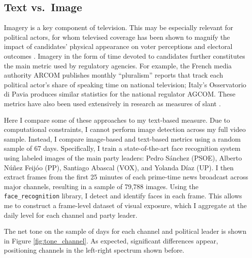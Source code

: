 \documentclass[12pt]{article}
\begin{document}
\subsection{Text vs.\ Image}




Imagery is a key component of television. This may be especially relevant for political actors, for whom televised coverage has been shown to magnify the impact of candidates’ physical appearance on voter perceptions and electoral outcomes \citep{Lenz2011LookingTP}. Imagery in the form of time devoted to candidates further constitutes the main metric used by regulatory agencies. For example, the French media authority ARCOM publishes monthly “pluralism” reports that track each political actor’s share of speaking time on national television; Italy’s Osservatorio di Pavia produces similar statistics for the national regulator AGCOM. These metrics have also been used extensively in research as measures of slant \citep[see, e.g.,][]{CageHengelHerveUrvoy2022,durante2012partisan}.

Here I compare some of these approaches to my text-based measure. Due to computational constraints, I cannot perform image detection across my full video sample. Instead, I compare image-based and text-based metrics using a random sample of 67 days. Specifically, I train a state-of-the-art face recognition system \citep{face_recognition} using labeled images of the main party leaders: Pedro Sánchez (PSOE), Alberto Núñez Feijóo (PP), Santiago Abascal (VOX), and Yolanda Díaz (UP). I then extract frames from the first 25 minutes of each prime-time news broadcast across major channels, resulting in a sample of 79,788 images. Using the \texttt{face\_recognition} library, I detect and identify faces in each frame. This allows me to construct a frame-level dataset of visual exposure, which I aggregate at the daily level for each channel and party leader.

The net tone on the sample of days for each channel and political leader is shown in Figure 	\ref{fig:tone_channel}. As expected, significant differences appear, positioning channels in the left-right spectrum shown before. 
\end{document}
